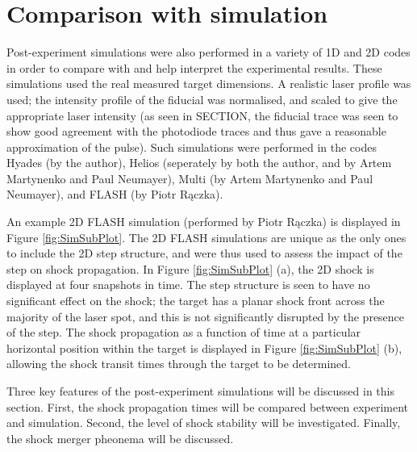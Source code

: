 \section{Comparison with simulation} \label{Post shock simulations}

Post-experiment simulations were also performed in a variety of 1D and 2D codes in order to compare with and help interpret the experimental results. These simulations used the real measured target dimensions. A realistic laser profile was used; the intensity profile of the fiducial was normalised, and scaled to give the appropriate laser intensity (as seen in SECTION, the fiducial trace was seen to show good agreement with the photodiode traces and thus gave a reasonable approximation of the pulse). Such simulations were performed in the codes Hyades (by the author), Helios (seperately by both the author, and by Artem Martynenko and Paul Neumayer), Multi (by Artem Martynenko and Paul Neumayer), and FLASH (by Piotr R\k{a}czka).

An example 2D FLASH simulation (performed by Piotr R\k{a}czka) is displayed in Figure \ref{fig:SimSubPlot}. The 2D FLASH simulations are unique as the only ones to include the 2D step structure, and were thus used to assess the impact of the step on shock propagation. In Figure \ref{fig:SimSubPlot} (a), the 2D shock is displayed at four snapshots in time. The step structure is seen to have no significant effect on the shock; the target has a planar shock front across the majority of the laser spot, and this is not significantly disrupted by the presence of the step. The shock propagation as a function of time at a particular horizontal position within the target is displayed in Figure \ref{fig:SimSubPlot} (b), allowing the shock transit times through the target to be determined.

Three key features of the post-experiment simulations will be discussed in this section. First, the shock propagation times will be compared between experiment and simulation. Second, the level of shock stability will be investigated. Finally, the shock merger pheonema will be discussed.


